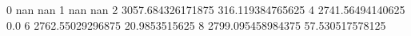 0 nan nan
1 nan nan
2 3057.684326171875 316.119384765625
4 2741.56494140625 0.0
6 2762.55029296875 20.9853515625
8 2799.095458984375 57.530517578125
